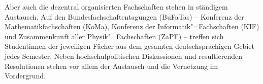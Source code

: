 Aber auch die dezentral organisierten Fachschaften stehen in ständigem Austausch.
Auf den Bundesfachschaftentagungen (BuFaTas) -- Konferenz der Mathematikfachschaften (KoMa), Konferenz der Informatik"=Fachschaften (KIF) und Zusammenkunft aller Physik"=Fachschaften (ZaPF) -- treffen sich Studentinnen der jeweiligen Fächer aus dem gesamten deutschsprachigen Gebiet jedes Semester.
Neben hochschulpolitischen Diskussionen und resultierenden Resolutionen stehen vor allem der Austausch und die Vernetzung im Vordergrund.
